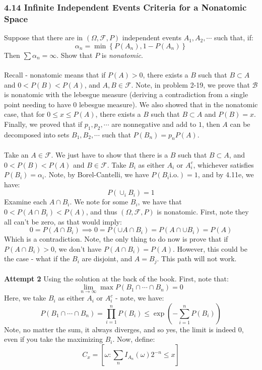 \documentclass[12pt,a4paper]{article}
\newcommand{\1}[1]{\mathbbm{1}\left\{ #1 \right\}}
\newcommand{\fcal}{\mathcal{F}}
\newcommand{\bcal}{\mathcal{B}}
\newcommand{\io}{\text{i.o.}}
\begin{document}
\subsubsection{4.14 Infinite Independent Events Criteria for a Nonatomic Space} Suppose that there are in $(\Omega, \fcal, P)$ independent events $A_1, A_2, \cdots$ such that, if:
$$
	\alpha_n = \min\left\{P(A_n), 1 - P(A_n)\right\}
$$
Then $\sum \alpha_n = \infty$. Show that $P$ is \textit{nonatomic}. 
\\\\
Recall - nonatomic means that if $P(A) > 0$, there exists a $B$ such that $B \subset A$ and $0 < P(B) < P(A)$, and $A,B \in \fcal$. Note, in problem 2-19, we prove that $\bcal$ is nonatomic with the lebesgue measure (deriving a contradiction from a single point needing to have $0$ lebesgue measure). We also showed that in the nonatomic case, that for $0 \leq x \leq P(A)$, there exists a $B$ such that $B \subset A$ and $P(B) = x$. Finally, we proved that if $p_1, p_2, \cdots$ are nonnegative and add to $1$, then $A$ can be decomposed into sets $B_1, B_2, \cdots$ such that $P(B_n) = p_nP(A)$.
\\\\
Take an $A \in \fcal$. We just have to show that there is a $B$ such that $B \subset A$, and $0 < P(B) < P(A)$ and $B \in \fcal$. Take $B_i$ as either $A_i$ or $A_i^c$, whichever satisfies $P(B_i) = \alpha_i$. Note, by Borel-Cantelli, we have $P(B_i \io) = 1$, and by 4.11e, we have:
$$
	P(\cup_i B_i) = 1
$$
Examine each $A \cap B_i$. We note for some $B_i$, we have that $0 < P(A \cap B_i) < P(A)$, and thus $(\Omega,\fcal,P)$ is nonatomic. First, note they all can't be zero, as that would imply:
$$
	0 = P(A \cap B_i) \implies
	0 = P(\cup A \cap B_i) = P(A \cap \cup B_i) = P(A)
$$
Which is a contradiction. Note, the only thing to do now is prove that if $P(A \cap B_i) > 0$, we don't have $P(A \cap B_i) = P(A)$. However, this could be the case - what if the $B_i$ are disjoint, and $A = B_j$. This path will not work.
\\\\
\textbf{Attempt 2} Using the solution at the back of the book. First, note that:
$$
	\lim_{n \to \infty} \max P(B_1 \cap \cdots \cap B_n) = 0
$$
Here, we take $B_i$ as either $A_i$ or $A_i^c$ - note, we have:
$$
	P(B_1 \cap \cdots \cap B_n) = \prod_{i=1}^n P(B_i) \leq \exp\left(-\sum_{i=1}^n P(B_i)\right)
$$
Note, no matter the sum, it always diverges, and so yes, the limit is indeed $0$, even if you take the maximizing $B_i$. Now, define:
$$
	C_x = \left[\omega: \sum_n I_{A_n}(\omega) 2^{-n} \leq x\right]
$$
\end{document}
